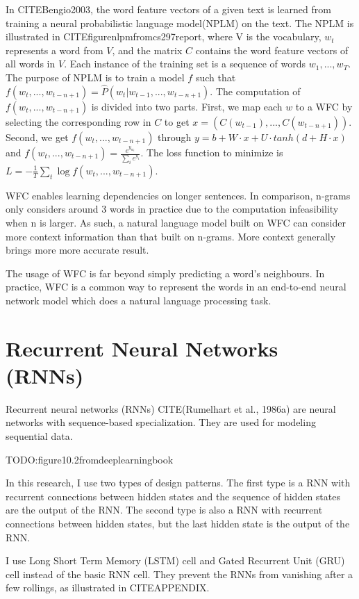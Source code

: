 \documentclass[modernstyle,12pt]{sjsuthesis}
\theoremstyle{definition}
\begin{document}
In CITEBengio2003, the word feature vectors of a given text is learned from training a neural probabilistic language model(NPLM) on the text. The NPLM is illustrated in CITEfigurenlpmfromcs297report, where V is the vocabulary, $w_t$ represents a word from $V$, and the matrix $C$ contains the word feature vectors of all words in $V$. Each instance of the training set is a sequence of words $w_1,...,w_T$. The purpose of NPLM is to train a model $f$ such that $ f(w_t, ..., w_{t-n+1}) = \hat{P}(w_t | w_{t-1},...,w_{t-n+1})$. The computation of $f(w_t, ..., w_{t-n+1})$ is divided into two parts.
First, we map each $w$ to a WFC by selecting the corresponding row in $C$ to get $x=(C(w_{t-1}),... ,C(w_{t-n+1}))$. Second, we get $f(w_t, ..., w_{t-n+1})$ through $y=b+W\cdot x + U\cdot tanh(d + H\cdot x)$ and $ f(w_t, ..., w_{t-n+1}) = \frac{e^{y_{w_t}}}{\sum_{i}^{}e^{y_i}}$. The loss function to minimize is $L = -\frac{1}{T}\sum _{t}^{} \log{f(w_t, ..., w_{t-n+1})}$.


WFC enables learning dependencies on longer sentences. In comparison, n-grams only considers around 3 words in practice due to the computation infeasibility when n is larger. As such, a natural language model built on WFC can consider more context information than that built on n-grams. More context generally brings more more accurate result.

The usage of WFC is far beyond simply predicting a word's neighbours. In practice, WFC is a common way to represent the words in an end-to-end neural network model which does a natural language processing task.
\section{Recurrent Neural Networks (RNNs)}
Recurrent neural networks (RNNs) CITE(Rumelhart et al., 1986a) are neural networks with sequence-based specialization. They are used for modeling sequential data.

TODO:figure10.2fromdeeplearningbook

In this research, I use two types of design patterns. The first type is a RNN with recurrent connections between hidden states and the sequence of hidden states are the output of the RNN. The second type is also a RNN with recurrent connections between hidden states, but the last hidden state is the output of the RNN.

I use Long Short Term Memory (LSTM) cell and Gated Recurrent Unit (GRU) cell instead of the basic RNN cell. They prevent the RNNs from vanishing after a few rollings, as illustrated in CITEAPPENDIX.
\end{document}
